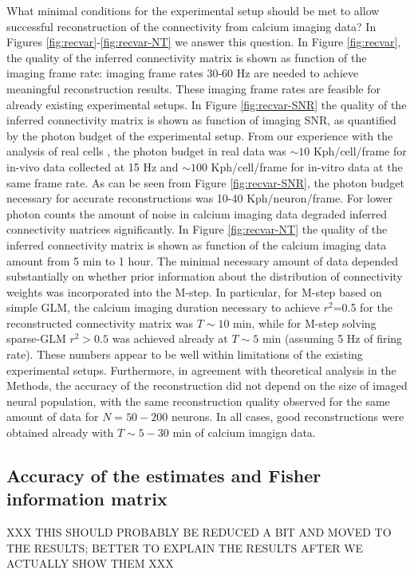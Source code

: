 What minimal conditions for the experimental setup should be met to allow successful reconstruction of the connectivity from calcium imaging data? In Figures \ref{fig:recvar}-\ref{fig:recvar-NT} we answer this question. In Figure \ref{fig:recvar}, the quality of the inferred connectivity matrix is shown as function of the imaging frame rate: imaging frame rates 30-60 Hz are needed to achieve meaningful reconstruction results. These imaging frame rates are feasible for already existing experimental setups. In Figure \ref{fig:recvar-SNR} the quality of the inferred connectivity matrix is shown as function of imaging SNR, as quantified by the photon budget of the experimental setup. From our experience with the analysis of real cells \cite{Vogelstein2009}, the photon budget in real data was $\sim 10$ Kph/cell/frame for in-vivo data collected at 15  Hz and $\sim 100$ Kph/cell/frame for in-vitro data at the same frame rate. As can be seen from Figure \ref{fig:recvar-SNR}, the photon budget necessary for accurate reconstructions was 10-40 Kph/neuron/frame. For lower photon counts the amount of noise in calcium imaging data degraded inferred connectivity matrices significantly.
In Figure \ref{fig:recvar-NT} the quality of the inferred connectivity matrix is shown as function of the calcium imaging data amount from 5 min to 1 hour. The minimal necessary amount of data depended substantially on whether prior information about the distribution of connectivity weights was incorporated into the M-step. In particular, for M-step based on simple GLM, the calcium imaging duration necessary to achieve $r^2$=0.5 for the reconstructed connectivity matrix was $T\sim 10$ min, while for M-step solving sparse-GLM $r^2>0.5$ was achieved already at $T\sim 5$ min (assuming 5 Hz of firing rate).
These numbers appear to be well within limitations of the existing experimental setups.
Furthermore, in agreement with theoretical analysis in the Methods, the accuracy of the reconstruction did not depend on the size of imaged neural population, with the same reconstruction quality observed for the same amount of data for $N=50-200$ neurons. In all cases, good reconstructions were obtained already with $T\sim 5-30$ min of calcium imagign data.


\subsection{Accuracy of the estimates and Fisher information matrix} \label{sec:methods:accuracy_Fisher}

XXX THIS SHOULD PROBABLY BE REDUCED A BIT AND MOVED TO THE RESULTS;
BETTER TO EXPLAIN THE RESULTS AFTER WE ACTUALLY SHOW THEM XXX

